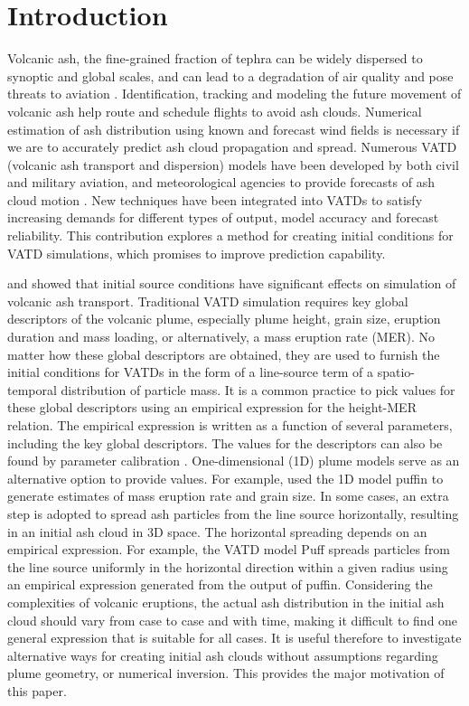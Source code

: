 \documentclass[utf8]{frontiersSCNS} %
\begin{document}
\section{Introduction}
Volcanic ash, the fine-grained fraction of tephra can be widely dispersed to synoptic and global scales, and can lead to a degradation of air quality and pose threats to aviation \citep{tupper2007facing}. Identification, tracking and modeling the future movement of volcanic ash help route and schedule flights to avoid ash clouds. Numerical estimation of ash distribution using known and forecast wind fields is necessary if we are to accurately predict ash cloud propagation and spread. Numerous VATD (volcanic ash transport and dispersion) models have been developed by both civil and military aviation, and meteorological agencies to provide forecasts of ash cloud motion \citep{witham2007comparison}. New techniques have been integrated into VATDs to satisfy increasing demands for different types of output, model accuracy and forecast reliability. This contribution explores a method for creating initial conditions for VATD simulations, which promises to improve prediction capability.

\citet{fero2009simulating} and \citet{stohl2011determination} showed that initial source conditions have significant effects on simulation of volcanic ash transport. Traditional VATD simulation requires key global descriptors of the volcanic plume, especially plume height, grain size, eruption duration and mass loading, or alternatively, a mass eruption rate (MER). No matter how these global descriptors are obtained, they are used to furnish the initial conditions for VATDs in the form of a line-source term of a spatio-temporal distribution of particle mass. It is a common practice to pick values for these global descriptors using an empirical expression for the height-MER relation. The empirical expression is written as a function of several parameters, including the key global descriptors. The values for the descriptors can also be found by parameter calibration \citep[e.g.][]{fero2008simulation,fero2009simulating, stohl2011determination, zidikheri2017estimation}. One-dimensional (1D) plume models serve as an alternative option to provide values. For example, \citet{bursik2012estimation} used the 1D model puffin \citep{bursik2001effect} to generate estimates of mass eruption rate and grain size. In some cases, an extra step is adopted to spread ash particles from the line source horizontally, resulting in an initial ash cloud in 3D space. The horizontal spreading depends on an empirical expression. For example, the VATD model Puff spreads particles from the line source uniformly in the horizontal direction within a given radius using an empirical expression generated from the output of puffin. Considering the complexities of volcanic eruptions, the actual ash distribution in the initial ash cloud should vary from case to case and with time, making it difficult to find one general expression that is suitable for all cases. It is useful therefore to investigate alternative ways for creating initial ash clouds without assumptions regarding plume geometry, or numerical inversion. This provides the major motivation of this paper.
\end{document}
